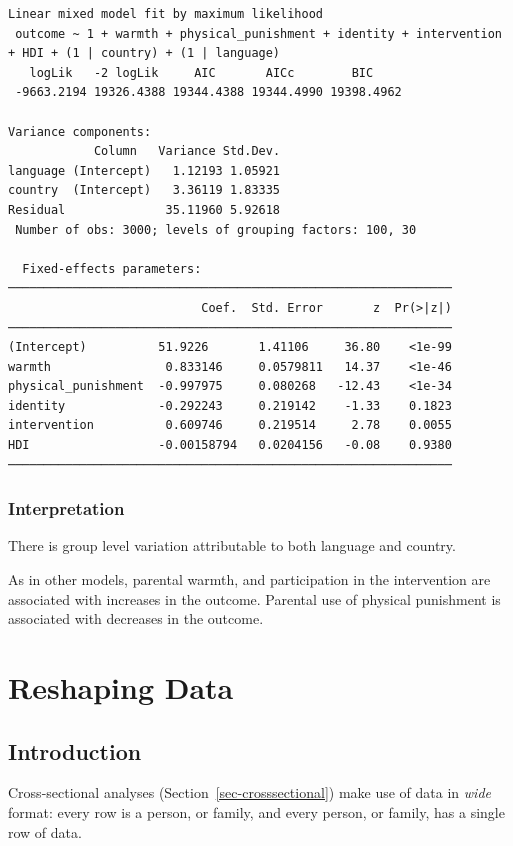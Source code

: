 \documentclass[
  letterpaper,
  DIV=11,
  numbers=noendperiod]{scrreprt}
\begin{document}
\begin{verbatim}
Linear mixed model fit by maximum likelihood
 outcome ~ 1 + warmth + physical_punishment + identity + intervention + HDI + (1 | country) + (1 | language)
   logLik   -2 logLik     AIC       AICc        BIC    
 -9663.2194 19326.4388 19344.4388 19344.4990 19398.4962

Variance components:
            Column   Variance Std.Dev.
language (Intercept)   1.12193 1.05921
country  (Intercept)   3.36119 1.83335
Residual              35.11960 5.92618
 Number of obs: 3000; levels of grouping factors: 100, 30

  Fixed-effects parameters:
──────────────────────────────────────────────────────────────
                           Coef.  Std. Error       z  Pr(>|z|)
──────────────────────────────────────────────────────────────
(Intercept)          51.9226       1.41106     36.80    <1e-99
warmth                0.833146     0.0579811   14.37    <1e-46
physical_punishment  -0.997975     0.080268   -12.43    <1e-34
identity             -0.292243     0.219142    -1.33    0.1823
intervention          0.609746     0.219514     2.78    0.0055
HDI                  -0.00158794   0.0204156   -0.08    0.9380
──────────────────────────────────────────────────────────────
\end{verbatim}

\subsection{Interpretation}\label{interpretation-6}

There is group level variation attributable to both language and
country.

As in other models, parental warmth, and participation in the
intervention are associated with increases in the outcome. Parental use
of physical punishment is associated with decreases in the outcome.


\chapter{Reshaping Data}\label{sec-reshape}

\section{Introduction}\label{introduction-2}

Cross-sectional analyses (Section~\ref{sec-crosssectional}) make use of
data in \emph{wide} format: every row is a person, or family, and every
person, or family, has a single row of data.
\end{document}
